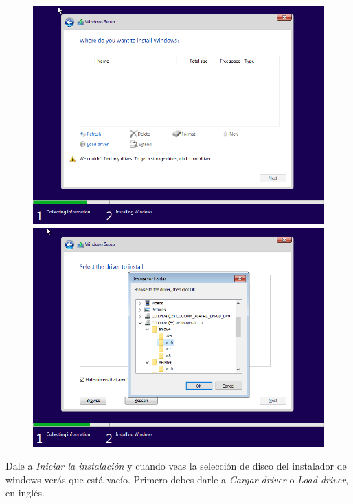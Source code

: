 \documentclass[11pt]{article}
\begin{document}
\begin{figure}[h!]
	\centering
	\begin{minipage}[b]{0.4965\textwidth}
		\includegraphics[width=\textwidth]{images/windows-setup-01.png}
	\end{minipage}
	\begin{minipage}[b]{0.4965\textwidth}
		\includegraphics[width=\textwidth]{images/windows-setup-02.png}
	\end{minipage}
\end{figure}

Dale a \textit{Iniciar la instalación} y cuando veas la selección de disco del instalador de windows verás que está vacío. Primero debes darle a \textit{Cargar driver} o \textit{Load driver}, en inglés.
\end{document}
